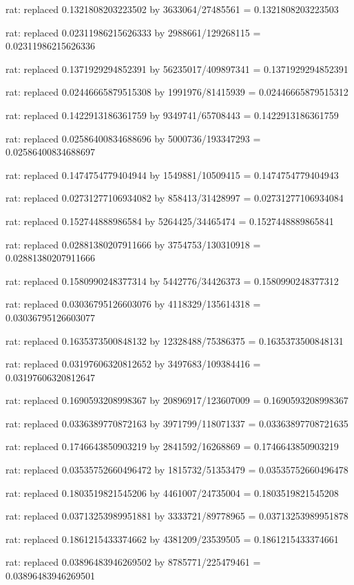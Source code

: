 \documentclass[a4paper,10pt]{article}
\begin{document}
\begin{eulernotebook}
\begin{eulercomment}
\begin{eulercomment}
\begin{eulercomment}
\begin{eulercomment}
\begin{eulercomment}
\begin{eulercomment}
\begin{eulercomment}
\begin{eulercomment}
\begin{eulercomment}
\begin{eulercomment}
\begin{eulercomment}
\begin{eulercomment}
\begin{eulercomment}
\begin{eulercomment}
\begin{eulercomment}
\begin{eulercomment}
\begin{euleroutput}
  rat: replaced 0.1321808203223502 by 3633064/27485561 = 0.1321808203223503
  
  rat: replaced 0.02311986215626333 by 2988661/129268115 = 0.02311986215626336
  
  rat: replaced 0.1371929294852391 by 56235017/409897341 = 0.1371929294852391
  
  rat: replaced 0.02446665879515308 by 1991976/81415939 = 0.02446665879515312
  
  rat: replaced 0.1422913186361759 by 9349741/65708443 = 0.1422913186361759
  
  rat: replaced 0.02586400834688696 by 5000736/193347293 = 0.02586400834688697
  
  rat: replaced 0.1474754779404944 by 1549881/10509415 = 0.1474754779404943
  
  rat: replaced 0.02731277106934082 by 858413/31428997 = 0.02731277106934084
  
  rat: replaced 0.152744888986584 by 5264425/34465474 = 0.1527448889865841
  
  rat: replaced 0.02881380207911666 by 3754753/130310918 = 0.02881380207911666
  
  rat: replaced 0.1580990248377314 by 5442776/34426373 = 0.1580990248377312
  
  rat: replaced 0.03036795126603076 by 4118329/135614318 = 0.03036795126603077
  
  rat: replaced 0.1635373500848132 by 12328488/75386375 = 0.1635373500848131
  
  rat: replaced 0.03197606320812652 by 3497683/109384416 = 0.03197606320812647
  
  rat: replaced 0.1690593208998367 by 20896917/123607009 = 0.1690593208998367
  
  rat: replaced 0.0336389770872163 by 3971799/118071337 = 0.03363897708721635
  
  rat: replaced 0.1746643850903219 by 2841592/16268869 = 0.1746643850903219
  
  rat: replaced 0.03535752660496472 by 1815732/51353479 = 0.03535752660496478
  
  rat: replaced 0.1803519821545206 by 4461007/24735004 = 0.1803519821545208
  
  rat: replaced 0.03713253989951881 by 3333721/89778965 = 0.03713253989951878
  
  rat: replaced 0.1861215433374662 by 4381209/23539505 = 0.1861215433374661
  
  rat: replaced 0.03896483946269502 by 8785771/225479461 = 0.03896483946269501
  

\end{euleroutput}
\end{eulercomment}
\end{eulercomment}
\end{eulercomment}
\end{eulercomment}
\end{eulercomment}
\end{eulercomment}
\end{eulercomment}
\end{eulercomment}
\end{eulercomment}
\end{eulercomment}
\end{eulercomment}
\end{eulercomment}
\end{eulercomment}
\end{eulercomment}
\end{eulercomment}
\end{eulercomment}
\end{eulernotebook}
\end{document}
